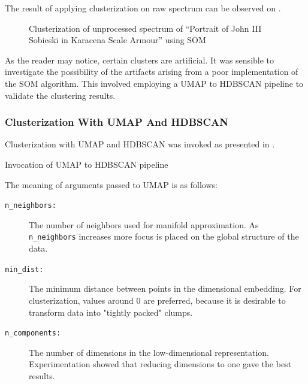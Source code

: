 The result of applying clusterization on raw spectrum can be observed on .

\newpage
\begin{figure}[H] 
  \centering     
   
  \caption{Clusterization of unprocessed spectrum of ``Portrait of John III Sobieski in Karacena Scale Armour'' using SOM}
  \label{fig:sobieski_clustered_som_noise}
\end{figure}

As the reader may notice, certain clusters are artificial. 
It was sensible to investigate the possibility of the artifacts arising from a poor implementation of the SOM algorithm.
This involved employing a UMAP to HDBSCAN pipeline to validate the clustering results.

\subsubsection{Clusterization With UMAP And HDBSCAN}
Clusterization with UMAP and HDBSCAN was invoked as presented in .

\newenvironment{longlistingH}{\captionsetup{type=listing, width=0.8\textwidth}}{}
\begin{longlistingH}
    \caption{Invocation of UMAP to HDBSCAN pipeline}
    \label{lst:umap-hdbscan-invocation}
\end{longlistingH}
\vspace{12pt}

The meaning of arguments passed to UMAP is as follows:
\begin{description}
    \item[\texttt{n\_neighbors:}] The number of neighbors used for manifold approximation. As \texttt{n\_neighbors} increases more focus is placed on the global structure of the data. 
    \item[\texttt{min\_dist:}] The minimum distance between points in the dimensional embedding. For clusterization, values around 0 are preferred, because it is desirable to transform data into "tightly packed" clumps.
    \item[\texttt{n\_components:}] The number of dimensions in the low-dimensional representation. Experimentation showed that reducing dimensions to one gave the best results. 
\end{description}

